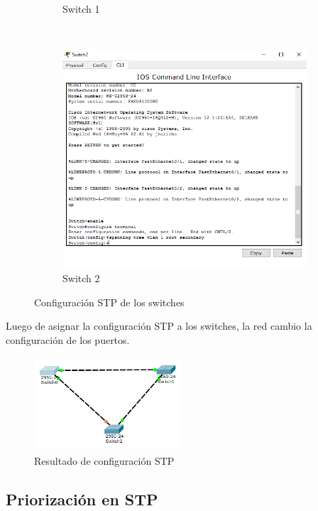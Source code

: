 \documentclass[spanish]{udpreport}
\begin{document}
\begin{figure}[htb]
\begin{subfigure}[b]{0.3\textwidth}
        \caption{Switch 1} \label{fig:photos/switch_1_primario.png}
    \end{subfigure}
    ~
    \begin{subfigure}[b]{0.3\textwidth}
        \includegraphics[width=\textwidth]{photos/switch_2_secundario.png}
        \caption{Switch 2} \label{fig:photos/switch_2_secundario.png}
    \end{subfigure}
    \caption{Configuración STP de los switches}
\end{figure}
\newpage
Luego de asignar la configuración STP a los switches, la red cambio la configuración de los puertos.

\begin{figure}[htb]
\centering
\includegraphics[width=5.5cm, height=3.5cm]{photos/red_despues_de_configurar_switchs.png}
\caption{Resultado de configuración STP} \label{fig:photos/red_despues_de_configurar_switchs.png}
\end{figure}

\subsection{Priorización en STP}
\end{document}
